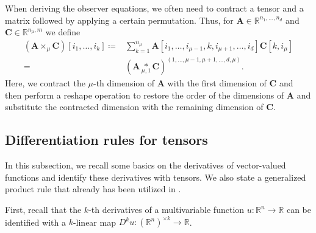 \documentclass[11pt,reqno]{amsart}
\numberwithin{equation}{section}
\theoremstyle{plain}
\newcommand{\R}{\mathbb{R}}
\newcommand{\tenp}[2]{\underset{#1,#2}{*}}
\begin{document}
When deriving the observer equations, we often need to contract a tensor and a matrix followed by applying a certain permutation. Thus, for $\mathbf{A}\in \R^{n_1,\dots,n_d}$ and $\mathbf{C}\in \R^{n_\mu,m}$ we define 
\begin{align*}
  \left(\mathbf{A} \times_\mu \mathbf{C}\right)[i_1,\dots,i_k] \coloneqq& \sum_{k=1}^{n_\mu} \mathbf{A}[i_1,\dots,i_{\mu-1},k,i_{\mu+1},\dots,i_d]\mathbf{C}[k,i_\mu]\\
  =& \left(  \mathbf{A} \tenp{\mu}{1} \mathbf{C} \right)^{(1,\dots,\mu-1,\mu+1,\dots,d,\mu)}.
\end{align*}
Here, we contract the $\mu$-th dimension of $\mathbf{A}$ with the first dimension of $\mathbf{C}$ and then perform a reshape operation to restore the order of the dimensions of $\mathbf{A}$ and substitute the contracted dimension with the remaining dimension of $\mathbf{C}$.

\subsection{Differentiation rules for tensors}\label{S:DifferentiationRules}

In this subsection, we recall some basics on the derivatives of vector-valued functions and identify these derivatives with tensors. We also state a generalized product rule that already has been utilized in \cite{BreKP19}.

First, recall that the $k$-th derivatives of a multivariable function $u\colon\R^n\to\R$ can be identified with a $k$-linear map $D^{k} u\colon (\R^n)^{\times k}\to \R$.
\end{document}
